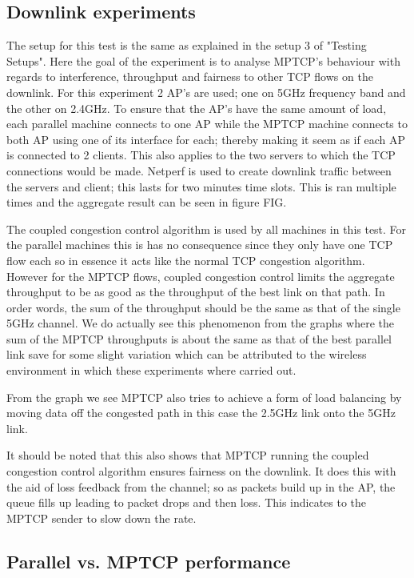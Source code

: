 \documentclass[12pt,a4paper]{article}
\begin{document}
\subsection{Downlink experiments}
The setup for this test is the same as explained in the setup 3 of "Testing
Setups". Here the goal of the experiment is to analyse MPTCP's behaviour with
regards to interference, throughput and fairness to other TCP flows on the
downlink. For this experiment 2 AP's are used; one on 5GHz frequency band and
the other on 2.4GHz. To ensure that the AP's have the same amount of load, each
parallel machine connects to one AP while the MPTCP machine connects to both AP
using one of its interface for each; thereby making it seem as if each AP is
connected to 2 clients. This also applies to the two servers to which the TCP
connections would be made. Netperf is used to create downlink traffic between
the servers and client; this lasts for two minutes time slots. This is ran
multiple times and the aggregate result can be seen in figure FIG.             %

The coupled congestion control algorithm is used by all machines in this test.
For the parallel machines this is has no consequence since they only have one
TCP flow each so in essence it acts like the normal TCP congestion algorithm.
However for the MPTCP flows, coupled congestion control limits the aggregate
throughput to be as good as the throughput of the best link on that path. In
order words, the sum of the throughput should be the same as that of the single
5GHz channel. We do actually see this phenomenon from the graphs where the sum
of the MPTCP throughputs is about the same as that of the best parallel link
save for some slight variation which can be attributed to the wireless
environment in which these experiments where carried out.

From the graph we see MPTCP also tries to achieve a form of load balancing by
moving data off the congested path in this case the 2.5GHz link onto the 5GHz
link.

It should be noted that this also shows that MPTCP running the coupled
congestion control algorithm ensures fairness on the downlink. It does this with
the aid of loss feedback from the channel; so as packets build up in the AP, the
queue fills up leading to packet drops and then loss. This indicates to the
MPTCP sender to slow down the rate.

\subsection{Parallel vs. MPTCP performance}
\end{document}

